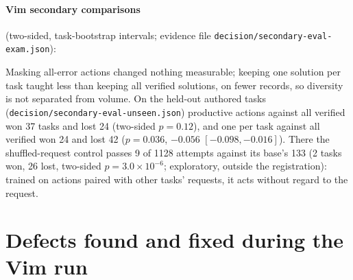 \paragraph{Vim secondary comparisons} (two-sided, task-bootstrap intervals; evidence file
\nolinkurl{decision/secondary-eval-exam.json}):

\begin{center}\footnotesize
{}
\end{center}

Masking all-error actions changed nothing measurable; keeping one solution per task taught less than keeping all verified
solutions, on fewer records, so diversity is not separated from volume. On the held-out authored tasks
(\nolinkurl{decision/secondary-eval-unseen.json}) productive actions against all verified won 37 tasks and lost 24 (two-sided
$p=0.12$), and one per task against all verified won 24 and lost 42 ($p=0.036$, $-0.056$ $[-0.098, -0.016]$). There the
shuffled-request control passes 9 of 1128 attempts against its base's 133 (2 tasks won, 26 lost, two-sided $p=3.0\times10^{-6}$; exploratory,
outside the registration): trained on actions paired with other tasks' requests, it acts without regard to the request.

\section{Defects found and fixed during the Vim run}\label{app:failures}


